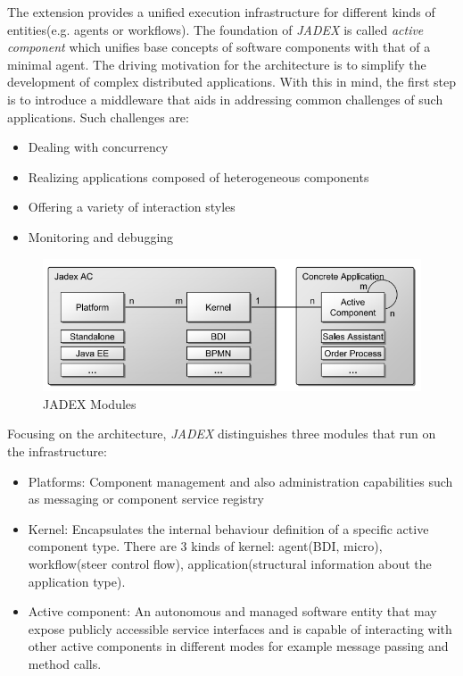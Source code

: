 \documentclass[a4paper, 11pt]{article}
\begin{document}
The extension provides a unified execution infrastructure for different kinds of entities(e.g. agents or workflows). The foundation of \textit{JADEX} is called \textit{active component} which unifies base concepts of software components with that of a minimal agent. The driving motivation for the architecture is to simplify the development of complex distributed applications. With this in mind, the first step is to introduce a middleware that aids in addressing common challenges of such applications. Such challenges are: 
\begin{itemize}
	\item Dealing with concurrency
	\item Realizing applications composed of heterogeneous components
	\item Offering a variety of interaction styles
	\item Monitoring and debugging
\end{itemize} 

\begin{figure}[H]
	\caption{JADEX Modules}
	\centering
	\includegraphics[scale=0.7]{./images/jadex_modules.png}
\end{figure}

Focusing on the architecture, \textit{JADEX} distinguishes three modules that run on the infrastructure: 
\begin{itemize}
	\item Platforms: Component management and also administration capabilities such as messaging or component service registry
	\item Kernel: Encapsulates the internal behaviour definition of a specific active component type. There are 3 kinds of kernel: agent(BDI, micro), workflow(steer control flow), application(structural information about the application type).
	\item Active component: An autonomous and managed software entity that may expose publicly accessible service interfaces and is capable of interacting with other active components in different modes for example message passing and method calls.
\end{itemize}
\end{document}
